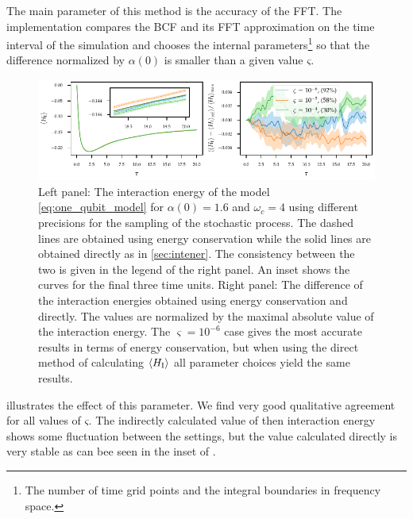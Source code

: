 The main parameter of this method is the accuracy of the FFT. The
implementation compares the BCF and its FFT approximation on the time
interval of the simulation and chooses the internal
parameters\footnote{The number of time grid points and the integral
  boundaries in frequency space.} so that the difference normalized by
\(α(0)\) is smaller than a given value \(ς\).

\begin{figure}[htp]
  \centering
  \includegraphics{figs/one_bath_syst/stocproc_systematics_interaction}
  \caption{\label{fig:stocproc_systematics} Left panel: The
    interaction energy of the model \cref{eq:one_qubit_model} for
    \(α(0)=1.6\) and \(ω_c=4\) using different precisions for the
    sampling of the stochastic process. The dashed lines are obtained
    using energy conservation while the solid lines are obtained
    directly as in \cref{sec:intener}. The consistency between the two
    is given in the legend of the right panel. An inset shows the
    curves for the final three time units. Right panel: The difference
    of the interaction energies obtained using energy conservation and
    directly. The values are normalized by the maximal absolute value
    of the interaction energy. The \(\varsigma = 10^{-6}\) case gives
    the most accurate results in terms of energy conservation, but
    when using the direct method of calculating \(\ev{H_{\inter}}\)
    all parameter choices yield the same results.}
\end{figure}
 illustrates the effect of this
parameter. We find very good qualitative agreement for all values of
\(ς\). The indirectly calculated value of then interaction energy
shows some fluctuation between the settings, but the value calculated
directly is very stable as can bee seen in the inset of
.

